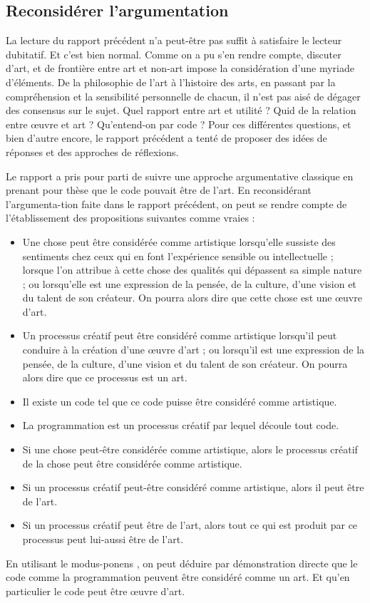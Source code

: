 \documentclass[12pt]{article} %
\begin{document}
\subsection{Reconsidérer l'argumentation}
La lecture du rapport précédent n'a peut-être pas suffit à satisfaire le lecteur dubitatif. Et c'est bien normal. Comme on a pu s'en rendre compte, discuter d'art, et de frontière entre art et non-art impose la considération d'une myriade d'éléments. De la philosophie de l'art à l'histoire des arts, en passant par la compréhension et la sensibilité personnelle de chacun, il n'est pas aisé de dégager des consensus sur le sujet. Quel rapport entre art et utilité ? Quid de la relation entre œuvre et art ? Qu'entend-on par code ? Pour ces différentes questions, et bien d'autre encore, le rapport précédent a tenté de proposer des idées de réponses et des approches de réflexions.

Le rapport a pris pour parti de suivre une approche argumentative classique en prenant pour thèse que le code pouvait être de l'art. En reconsidérant l'argumenta\hyp{}tion faite dans le rapport précédent, on peut se rendre compte de l'établissement des propositions suivantes comme vraies :
\begin{itemize}
    \item Une chose peut être considérée comme artistique lorsqu'elle sussiste des sentiments chez ceux qui en font l'expérience sensible ou intellectuelle ; lorsque l'on attribue à cette chose des qualités qui dépassent sa simple nature ; ou lorsqu'elle est une expression de la pensée, de la culture, d'une vision et du talent de son créateur. On pourra alors dire que cette chose est une œuvre d'art.
    \item Un processus créatif peut être considéré comme artistique lorsqu'il peut conduire à la création d'une œuvre d'art ; ou lorsqu'il est une expression de la pensée, de la culture, d'une vision et du talent de son créateur. On pourra alors dire que ce processus est un art.
    \item Il existe un code tel que ce code puisse être considéré comme artistique. 
    \item La programmation est un processus créatif par lequel découle tout code.
    \item Si une chose peut-être considérée comme artistique, alors le processus créatif de la chose peut être considérée comme artistique.
    \item Si un processus créatif peut-être considéré comme artistique, alors il peut être de l'art.
    \item Si un processus créatif peut être de l'art, alors tout ce qui est produit par ce processus peut lui-aussi être de l'art.
\end{itemize}
En utilisant le \gls{modus-ponens} \cite{SCalabretto-ALIA}, on peut déduire par démonstration directe que le code comme la programmation peuvent être considéré comme un art. Et qu'en particulier le code peut être œuvre d'art. 
\end{document}
